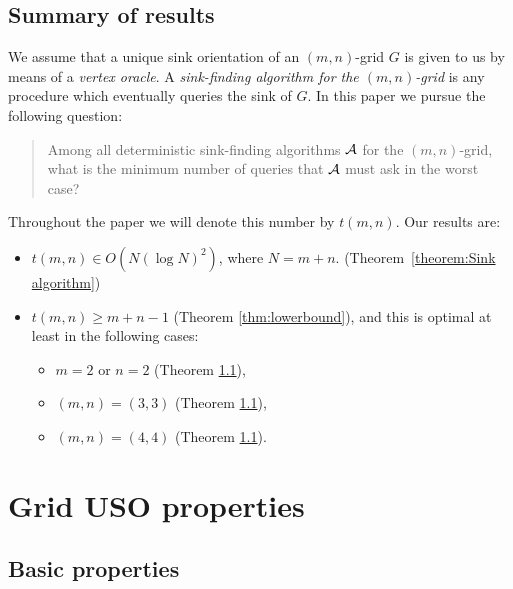 \documentclass[a4paper,10pt]{article}
\newtheorem{lemma}{Lemma}
\newcommand{\JN}[1]{\marginpar{\parbox{4cm}{{\small {\bf JN:} #1}}}} %
\begin{document}



\subsection{Summary of results}

We assume that a unique sink orientation of an $(m,n)$-grid $G$ is given to
us by means of a \emph{vertex oracle}.
A \emph{sink-finding algorithm for the $(m,n)$-grid} is any procedure which
eventually queries the sink of $G$.
In this paper we pursue the following question:
\begin{quote}
    Among all deterministic sink-finding algorithms $\cal A$ for the
    $(m,n)$-grid, what is the minimum number of queries that $\cal A$ must ask
    in the worst case?
\end{quote}
Throughout the paper we will denote this number by $t(m,n)$.
Our results are:

\begin{itemize}
    \item
        $t(m,n) \in O(N (\log N)^2)$, where $N = m+n$. (Theorem~\ref{theorem:Sink algorithm})
    \item
        $t(m,n) \ge m+n-1$ (Theorem \ref{thm:lowerbound}), and this is optimal at least in
        the following cases:
        \begin{itemize}
            \item $m=2$ or $n=2$ (Theorem \ref{}),
            \item $(m,n) = (3,3)$ (Theorem \ref{}),
            \item $(m,n) = (4,4)$ (Theorem \ref{}).
        \end{itemize}
\end{itemize}

\section{Grid USO properties}

\subsection{Basic properties}
\end{document}
